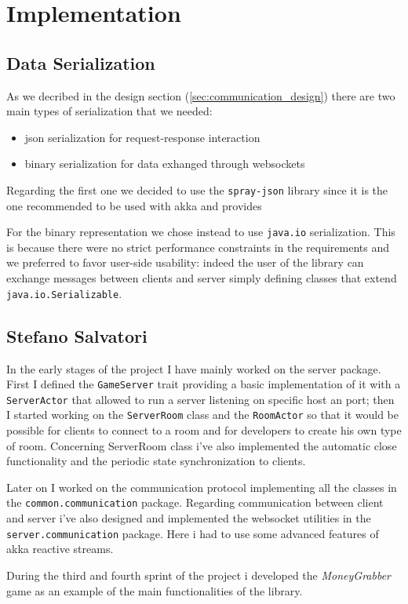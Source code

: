 \chapter{Implementation}
\section{Data Serialization}
As we decribed in the design section (\ref{sec:communication_design}) there are two main types of serialization that we needed:
\begin{itemize}
	\item json serialization for request-response interaction
	\item binary serialization for  data exhanged through websockets
\end{itemize}

Regarding the first one we decided to use the \texttt{spray-json} library since it is the one recommended to be used with akka and provides 

For the binary representation we chose instead to use \texttt{java.io} serialization. This is because there were no strict performance constraints in the requirements and we preferred to favor user-side usability: indeed the user of the library can exchange messages between clients and server simply defining classes that extend \texttt{java.io.Serializable}.



\section{Stefano Salvatori}
In the early stages of the project I have mainly worked on the server package. First I defined the \texttt{GameServer} trait providing a basic implementation of it with a \texttt{ServerActor} that allowed to run a server listening on specific host an port; then I started working on the \texttt{ServerRoom} class and the \texttt{RoomActor} so that it would be possible for clients to connect to a room and for developers to create his own type of room. Concerning ServerRoom class i've also implemented the automatic close functionality and the periodic state synchronization to clients.

Later on I worked on the communication protocol implementing all the classes in the \texttt{common.communication} package. Regarding communication between client and server i've also designed and implemented the websocket utilities in the \texttt{server.communication} package. Here i had to use some advanced features of akka reactive streams. 

During the third and fourth sprint of the project i developed the \textit{MoneyGrabber} game as an example of the main functionalities of the library. 